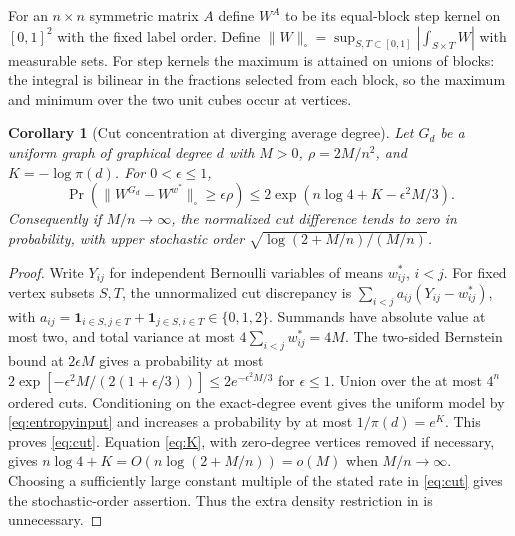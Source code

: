 \documentclass[11pt]{article}
\newtheorem{corollary}[theorem]{Corollary}
\theoremstyle{remark}\newtheorem{remark}[theorem]{Remark}
\begin{document}
For an $n\times n$ symmetric matrix $A$ define $W^A$ to be its equal-block step kernel on $[0,1]^2$ with the fixed label order. Define $\|W\|_\square=\sup_{S,T\subset[0,1]}|\int_{S\times T} W|$ with measurable sets. For step kernels the maximum is attained on unions of blocks: the integral is bilinear in the fractions selected from each block, so the maximum and minimum over the two unit cubes occur at vertices.
\begin{corollary}[Cut concentration at diverging average degree]\label{cor:cut}
Let $G_d$ be a uniform graph of graphical degree $d$ with $M>0$, $\rho=2M/n^2$, and $K=-\log\pi(d)$. For $0<\epsilon\le1$,
\begin{equation}\label{eq:cut}
 \Pr\left(\|W^{G_d}-W^{w^*}\|_\square\ge\epsilon\rho\right)
 \le 2\exp\left(n\log4+K-\epsilon^2M/3\right).
\end{equation}
Consequently if $M/n\to\infty$, the normalized cut difference tends to zero in probability, with upper stochastic order $\sqrt{\log(2+M/n)/(M/n)}$.
\end{corollary}
\begin{proof}
Write $Y_{ij}$ for independent Bernoulli variables of means $w_{ij}^*$, $i<j$. For fixed vertex subsets $S,T$, the unnormalized cut discrepancy is $\sum_{i<j}a_{ij}(Y_{ij}-w_{ij}^*)$, with $a_{ij}=\mathbf1_{i\in S,j\in T}+\mathbf1_{j\in S,i\in T}\in\{0,1,2\}$. Summands have absolute value at most two, and total variance at most $4\sum_{i<j}w^*_{ij}=4M$. The two-sided Bernstein bound at $2\epsilon M$ gives a probability at most $2\exp[-\epsilon^2M/(2(1+\epsilon/3))]\le2e^{-\epsilon^2M/3}$ for $\epsilon\le1$. Union over the at most $4^n$ ordered cuts. Conditioning on the exact-degree event gives the uniform model by \eqref{eq:entropyinput} and increases a probability by at most $1/\pi(d)=e^K$. This proves \eqref{eq:cut}. Equation \eqref{eq:K}, with zero-degree vertices removed if necessary, gives $n\log4+K=O(n\log(2+M/n))=o(M)$ when $M/n\to\infty$. Choosing a sufficiently large constant multiple of the stated rate in \eqref{eq:cut} gives the stochastic-order assertion. Thus the extra density restriction in \cite[Corollary 10.4]{mehrdad26} is unnecessary.
\end{proof}
\end{document}
